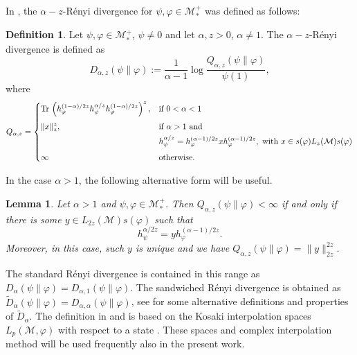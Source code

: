 \documentclass[12pt]{article}
\newtheorem{lemma}[theorem]{Lemma}
\theoremstyle{definition}
\newtheorem{defi}[theorem]{Definition}
\theoremstyle{remark}
\numberwithin{equation}{section}
\def\Me{\mathcal M}
\def \Tr{\mathrm{Tr}\,}
\begin{document}
In \cite{kato2023aremark, kato2023onrenyi}, the
$\alpha-z$-R\'enyi divergence for $\psi,\varphi\in \mathcal M_*^+$  was defined as
follows: 
\begin{defi}\label{defi:renyi} Let $\psi,\varphi\in \Me_*^+$, $\psi\ne 0$ and let
$\alpha,z>0$, $\alpha\ne 1$. The $\alpha-z$-R\'enyi divergence is defined as 
\[
D_{\alpha,z}(\psi\|\varphi):=\frac1{\alpha-1}\log
\frac{Q_{\alpha,z}(\psi\|\varphi)}{\psi(1)},
\]
where 
\[
Q_{\alpha,z}=\begin{dcases} \Tr
\left(h_\varphi^{(1-\alpha)/2z}h_\psi^{\alpha/z}h_\varphi^{(1-\alpha)/2z}\right)^z, &
\text{if } 0<\alpha<1\\[0.3em]
\|x\|_z^z, & \text{if } \alpha>1 \text{ and }\\
\ & h_\psi^{\alpha/z}=h_\varphi^{(\alpha-1)/2z}xh_\varphi^{(\alpha-1)/2z},\text{ with }
x\in s(\varphi)L_z(\Me)s(\varphi)\\[0.3em]
\infty& \text{otherwise}.
\end{dcases}
\]
\end{defi}


In the case $\alpha>1$, the following alternative form will be useful.

\begin{lemma}\cite{kato2023onrenyi} \label{lemma:renyi_2z}
Let $\alpha>1$ and $\psi,\varphi\in \Me_*^+$. Then $Q_{\alpha,z}(\psi\|\varphi)<\infty$ if
and only if there is some $y\in L_{2z}(\Me)s(\varphi)$ such that 
\[
h_\psi^{\alpha/2z}=yh_\varphi^{(\alpha-1)/2z}.
\]
Moreover, in this case, such $y$ is unique and we have
$Q_{\alpha,z}(\psi\|\varphi)=\|y\|_{2z}^{2z}$. 
\end{lemma}

The standard R\'enyi divergence \cite{petz1985quasi, hiai2018quantum, hiai2021quantum} is
contained in this range as $D_\alpha(\psi\|\varphi)=D_{\alpha,1}(\psi\|\varphi)$. The
sandwiched R\'enyi divergence  is obtained as $\tilde
D_\alpha(\psi\|\varphi)=D_{\alpha,\alpha}(\psi\|\varphi)$, see
\cite{berta2018renyi,hiai2021quantum,jencova2018renyi, jencova2021renyi} for some
alternative definitions and properties of $\tilde D_\alpha$. The definition in
\cite{jencova2018renyi} and \cite{jencova2021renyi} is based on the Kosaki interpolation
spaces  $L_p(\Me,\varphi)$ with respect to a state \cite{kosaki1984applications}. These spaces and
complex interpolation method will be used frequently also in the present work. 
\end{document}
